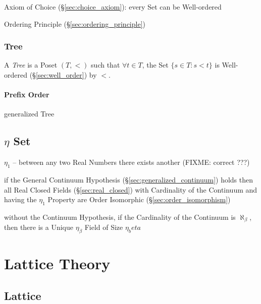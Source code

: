 Axiom of Choice (\S\ref{sec:choice_axiom}): every Set can be
Well-ordered

Ordering Principle (\S\ref{sec:ordering_principle})



\subsubsection{Tree} \label{sec:tree}

A \emph{Tree} is a Poset $(T,<)$ such that $\forall t \in T$, the Set
$\{s \in T : s < t \}$ is Well-ordered (\S\ref{sec:well_order}) by
$<$.



\paragraph{Prefix Order}\label{sec:prefix_order}\hfill

generalized Tree



\subsection{$\eta$ Set}\label{sec:eta_set}

$\eta_1$ -- between any two Real Numbers there exists another (FIXME: correct
???)

if the General Continuum Hypothesis (\S\ref{sec:generalized_continuum}) holds
then all Real Closed Fields (\S\ref{sec:real_closed}) with Cardinality of the
Continuum and having the $\eta_1$ Property are Order Isomorphic
(\S\ref{sec:order_isomorphism})

without the Continuum Hypothesis, if the Cardinality of the Continuum is
$\aleph_\beta$, then there is a Unique $\eta_\beta$ Field of Size $\eta_beta$



\section{Lattice Theory}\label{sec:lattice_theory}

\subsection{Lattice}\label{sec:lattice}

